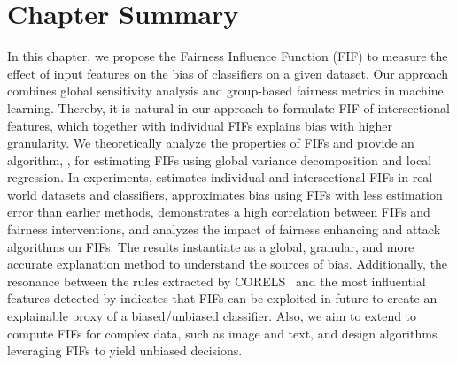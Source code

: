 \section{Chapter Summary}


In this chapter, we propose the Fairness Influence Function (FIF) to measure the effect of input features on the bias of classifiers on a given dataset. Our approach combines global sensitivity analysis and group-based fairness metrics in machine learning. Thereby, it is natural in our approach to formulate FIF of intersectional features, which together with individual FIFs explains bias with higher granularity. We theoretically analyze the properties of FIFs and provide an algorithm, {\fairXplainer}, for estimating FIFs using global variance decomposition and local regression. In experiments, {\fairXplainer} estimates individual and intersectional FIFs in real-world datasets and classifiers, approximates bias using FIFs with less estimation error than earlier methods, demonstrates a high correlation between FIFs and fairness interventions, and analyzes the impact of fairness enhancing and attack algorithms on FIFs. The results instantiate {\fairXplainer} as a global, granular, and more accurate explanation method to understand the sources of bias. Additionally, the resonance between the rules extracted by CORELS~\cite{rudin19stop} and the most influential features detected by {\fairXplainer} indicates that FIFs can be exploited in future to create an explainable proxy of a biased/unbiased classifier. Also, we aim to extend {\fairXplainer} to compute FIFs for complex data, such as image and text, and design algorithms leveraging FIFs to yield unbiased decisions.
%